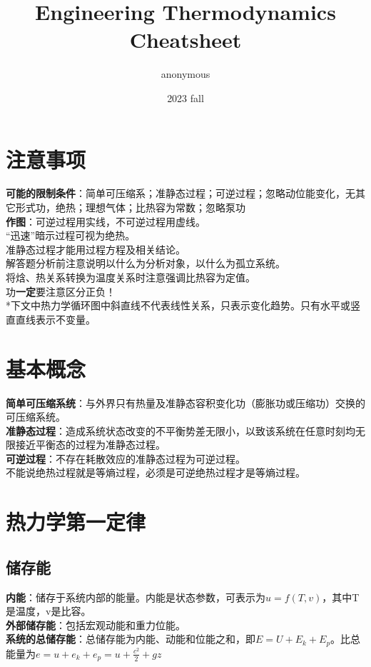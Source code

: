 \documentclass[a4paper,9pt]{ctexart}
\title{Engineering Thermodynamics Cheatsheet}
\author{anonymous}
\date{2023 fall}
\begin{document}
\maketitle

\section{注意事项}
\noindent
\textbf{可能的限制条件}：简单可压缩系；准静态过程；可逆过程；忽略动位能变化，无其它形式功，绝热；理想气体；比热容为常数；忽略泵功\\
\textbf{作图}：可逆过程用实线，不可逆过程用虚线。\\
“迅速”暗示过程可视为绝热。\\
准静态过程才能用过程方程及相关结论。\\
解答题分析前注意说明以什么为分析对象，以什么为孤立系统。\\
将焓、热关系转换为温度关系时注意强调比热容为定值。\\
功\textbf{一定}要注意区分正负！\\
*下文中热力学循环图中斜直线不代表线性关系，只表示变化趋势。只有水平或竖直直线表示不变量。

\section{基本概念}
\noindent
\textbf{简单可压缩系统}：与外界只有热量及准静态容积变化功（膨胀功或压缩功）交换的可压缩系统。\\
\textbf{准静态过程}：造成系统状态改变的不平衡势差无限小，以致该系统在任意时刻均无限接近平衡态的过程为准静态过程。\\
\textbf{可逆过程}：不存在耗散效应的准静态过程为可逆过程。\\
不能说绝热过程就是等熵过程，必须是可逆绝热过程才是等熵过程。

\section{热力学第一定律}

\subsection{储存能}
\noindent
\textbf{内能}：储存于系统内部的能量。内能是状态参数，可表示为$u=f(T,v)$，其中T是温度，v是比容。\\
\textbf{外部储存能}：包括宏观动能和重力位能。\\
\textbf{系统的总储存能}：总储存能为内能、动能和位能之和，即$E=U+E_k+E_p$。比总能量为$e=u+e_k+e_p=u+\frac{c^2}{2}+gz$
\end{document}
